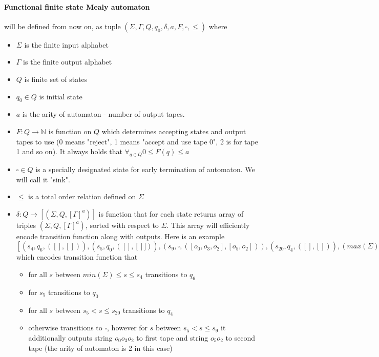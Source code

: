\documentclass[12pt]{article}
\begin{document}
\paragraph{Functional finite state Mealy automaton} will be defined from now on, as tuple $(\Sigma ,\Gamma ,  Q , q_0 , \delta , a , F , \square , \le )$ where 
\begin{itemize}
	\item $\Sigma$ is the finite input alphabet 
	\item $\Gamma$ is the finite output alphabet 
	\item $Q$ is finite set of states
	\item $q_0 \in Q$ is initial state
	\item $a$ is the arity of automaton - number of output tapes.
	\item $F : Q \rightarrow \mathbb{N}$ is function on $Q$ which determines accepting states and output tapes to use (0 means "reject", 1 means "accept and use tape 0", 2 is for tape 1 and so on). It always holds that $\forall_{q\in Q}0\le F(q)\le a$
	\item $\square \in Q$ is a specially designated state for early termination of automaton. We will call it "sink".
	\item $\le$ is a total order relation defined on $\Sigma$
	\item $\delta : Q \rightarrow [ (\Sigma , Q , [ \Gamma ]^a ) ]$ is function that for each state returns array of triples $(\Sigma , Q ,[\Gamma ]^a)$, sorted with respect to  $\Sigma$. This array will efficiently encode transition function along with outputs. Here is an example \\
	$[ (s_4,q_6,([],[])),(s_5,q_0,([],[]]) ),(s_9,\square,([  o_0 , o_3, o_2 ],[o_5,o_2]) ),(s_{20},q_4,([],[]) ),(max(\Sigma),\square,([],[]) ) ]$ \\
	which encodes transition function that
	\begin{itemize}
		\item for all $s$ between $min(\Sigma) \le s  \le s_4$ transitions to $q_6$ 
		\item for  $s_5$ transitions to $q_0$
		\item for all $s$ between  $s_{5} < s \le s_{20}$ transitions to $q_4$
		\item otherwise transitions to $\square$, however for $s$ between $s_5 < s \le s_9$ it additionally outputs string $o_0o_3o_2$ to first tape and string $o_5o_2$ to second tape (the arity of automaton is 2 in this case)
	\end{itemize} 
\end{itemize}
\end{document}
